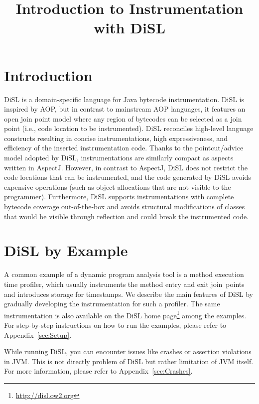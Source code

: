 \documentclass{article}
\begin{document}
\title{Introduction to Instrumentation with DiSL}

\maketitle

\section{Introduction}

DiSL is a domain-specific language for Java bytecode instrumentation.
DiSL is inspired by AOP, but in contrast to mainstream AOP languages, it features an open join point model where any region of bytecodes can be selected as a join point (i.e., code location to be instrumented).
DiSL reconciles high-level language constructs resulting in concise instrumentations, high expressiveness, and efficiency of the inserted instrumentation code.
Thanks to the pointcut/advice model adopted by DiSL, instrumentations are similarly compact as aspects written in AspectJ.
However, in contrast to AspectJ, DiSL does not restrict the code locations that can be instrumented, and the code generated by DiSL avoids expensive operations (such as object allocations that are not visible to the programmer).
Furthermore, DiSL supports instrumentations with complete bytecode coverage out-of-the-box and avoids structural modifications of classes that would be visible through reflection and could break the instrumented code.


\section{DiSL by Example}\label{sec:DiSL}

A common example of a dynamic program analysis tool is a method execution time profiler, which usually instruments the method entry and exit join~points and introduces storage for timestamps.
We describe the main features of DiSL by gradually developing the instrumentation for such a profiler.
The same instrumentation is also available on the DiSL home page\footnote{\url{http://disl.ow2.org}} among the examples.
For step-by-step instructions on how to run the examples, please refer to Appendix~\ref{sec:Setup}.

While running DiSL, you can encounter issues like crashes or assertion violations in JVM.
This is not directly problem of DiSL but rather limitation of JVM itself.
For more information, please refer to Appendix~\ref{sec:Crashes}.
\end{document}
